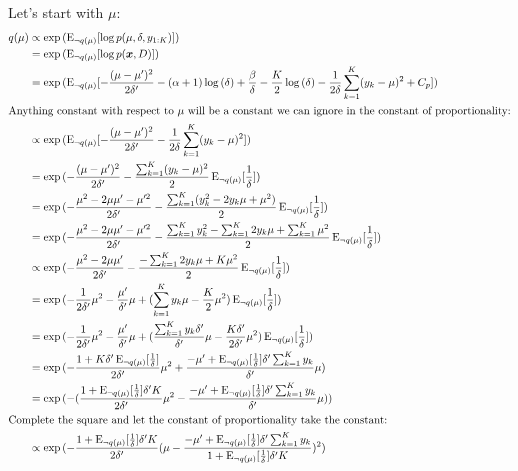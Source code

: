 \documentclass[12pt]{article}
\newcommand{\E}{\operatorname{E}}
\begin{document}
Let's start with $\mu$:
\begin{align}
    q(\mu) &\propto \exp{(\E_{\neg q(\mu)}[\log{p(\mu, \delta, y_{1:K})}])}
    \nonumber \\
    &= \exp{(\E_{\neg q(\mu)}[\log{p(\bm{x}, D)}])}
    \nonumber \\
    &= \exp{(\E_{\neg q(\mu)}[-\frac{(\mu-\mu')^2}{2\delta'}
    - (\alpha+1)\log{(\delta)} + \frac{\beta}{\delta}
    - \frac{K}{2}\log{(\delta)}
    - \frac{1}{2\delta} \sum_{k=1}^{K} (y_{k} - \mu)^2
    + C_p])}
    \nonumber \\
    \intertext{Anything constant with respect to $\mu$ will be a constant we can
    ignore in the constant of proportionality:}
    &\propto \exp{(\E_{\neg q(\mu)}[-\frac{(\mu-\mu')^2}{2\delta'}
    - \frac{1}{2\delta} \sum_{k=1}^{K} (y_{k} - \mu)^2])}
    \nonumber \\
    &= \exp{(-\frac{(\mu-\mu')^2}{2\delta'}
        - \frac{\sum_{k=1}^{K}(y_{k}-\mu)^2}{2}\E_{\neg q(\mu)}[\frac{1}{\delta}]
    )}
    \nonumber \\
    &= \exp{(-\frac{\mu^2 - 2\mu\mu' -\mu'^2}{2\delta'}
        - \frac{\sum_{k=1}^{K}(y_{k}^2 -2y_{k}\mu + \mu^2)}{2}\E_{\neg q(\mu)}[\frac{1}{\delta}]
    )}
    \nonumber \\
    &= \exp{(-\frac{\mu^2 - 2\mu\mu' -\mu'^2}{2\delta'}
        - \frac{\sum_{k=1}^{K}y_{k}^2 -\sum_{k=1}^{K}2y_{k}\mu + \sum_{k=1}^{K}\mu^2}{2}\E_{\neg q(\mu)}[\frac{1}{\delta}]
    )}
    \nonumber \\
    &\propto \exp{(-\frac{\mu^2 - 2\mu\mu'}{2\delta'}
        - \frac{-\sum_{k=1}^{K}2y_{k}\mu + K\mu^2}{2}\E_{\neg q(\mu)}[\frac{1}{\delta}]
    )}
    \nonumber \\
    &= \exp{(-\frac{1}{2\delta'}\mu^2 - \frac{\mu'}{\delta'}\mu
        + (\sum_{k=1}^{K}y_{k}\mu - \frac{K}{2}\mu^2)\E_{\neg q(\mu)}[\frac{1}{\delta}]
    )}
    \nonumber \\
    &= \exp{(-\frac{1}{2\delta'}\mu^2 - \frac{\mu'}{\delta'}\mu
        + (\frac{\sum_{k=1}^{K}y_{k}\delta'}{\delta'}\mu
        - \frac{K\delta'}{2\delta'}\mu^2)\E_{\neg q(\mu)}[\frac{1}{\delta}]
    )}
    \nonumber \\
    &= \exp{(-\frac{1+K\delta'\E_{\neg q(\mu)}[\frac{1}{\delta}]}{2\delta'}\mu^2
    + \frac{-\mu' + \E_{\neg q(\mu)}[\frac{1}{\delta}]\delta'\sum_{k=1}^{K}y_{k}}{\delta'}\mu
    )}
    \nonumber \\
    &= \exp{(-(\frac{1+\E_{\neg q(\mu)}[\frac{1}{\delta}]\delta'K}{2\delta'}\mu^2
    - \frac{-\mu' + \E_{\neg q(\mu)}[\frac{1}{\delta}]\delta'\sum_{k=1}^{K}y_{k}}{\delta'}\mu
    ))}
    \nonumber \\
    \intertext{Complete the square and let the constant of proportionality take
    the constant:}
    &\propto
    \exp{(-\frac{1+\E_{\neg q(\mu)}[\frac{1}{\delta}]\delta'K}{2\delta'}
    (\mu
    - \frac{
    -\mu' + \E_{\neg q(\mu)}[\frac{1}{\delta}]\delta'\sum_{k=1}^{K}y_{k}}
    {1 + \E_{\neg q(\mu)}[\frac{1}{\delta}]\delta'K})^2
    )}
\end{align}
\end{document}
